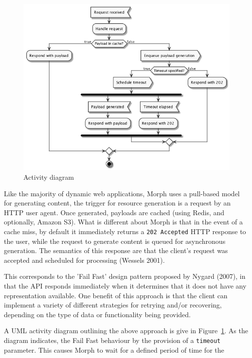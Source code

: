 \documentclass{article}
\begin{document}
\begin{figure}
  \begin{center}
    \includegraphics[width=\textwidth]{activity.png}
  \end{center}
  \label{activity}
  \caption{Activity diagram}
\end{figure}

Like the majority of dynamic web applications, Morph uses a pull-based model for generating content, the trigger for resource generation is a request by an HTTP user agent. Once generated, payloads are cached (using Redis, and optionally, Amazon S3). What is different about Morph is that in the event of a cache miss, by default it immediately returns a \texttt{202 Accepted} HTTP response to the user, while the request to generate content is queued for asynchronous generation. The semantics of this response are that the client's request was accepted and scheduled for processing (Wessels 2001).

This corresponds to the 'Fail Fast' design pattern proposed by Nygard (2007), in that the API responds immediately when it determines that it does not have any representation available. One benefit of this approach is that the client can implement a variety of different strategies for retrying and/or recovering, depending on the type of data or functionality being provided.

A UML activity diagram outlining the above approach is give in Figure~\ref{activity}. As the diagram indicates, the Fail Fast behaviour by the provision of a \texttt{timeout} parameter. This causes Morph to wait for a defined period of time for the 
\end{document}
